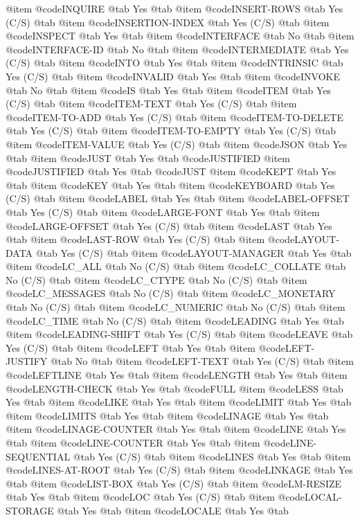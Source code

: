 @item @code{INQUIRE} @tab Yes @tab 
@item @code{INSERT-ROWS} @tab Yes	(C/S) @tab 
@item @code{INSERTION-INDEX} @tab Yes	(C/S) @tab 
@item @code{INSPECT} @tab Yes @tab 
@item @code{INTERFACE} @tab No @tab 
@item @code{INTERFACE-ID} @tab No @tab 
@item @code{INTERMEDIATE} @tab Yes	(C/S) @tab 
@item @code{INTO} @tab Yes @tab 
@item @code{INTRINSIC} @tab Yes	(C/S) @tab 
@item @code{INVALID} @tab Yes @tab 
@item @code{INVOKE} @tab No @tab 
@item @code{IS} @tab Yes @tab 
@item @code{ITEM} @tab Yes	(C/S) @tab 
@item @code{ITEM-TEXT} @tab Yes	(C/S) @tab 
@item @code{ITEM-TO-ADD} @tab Yes	(C/S) @tab 
@item @code{ITEM-TO-DELETE} @tab Yes	(C/S) @tab 
@item @code{ITEM-TO-EMPTY} @tab Yes	(C/S) @tab 
@item @code{ITEM-VALUE} @tab Yes	(C/S) @tab 
@item @code{JSON} @tab Yes @tab 
@item @code{JUST} @tab Yes @tab @code{JUSTIFIED}
@item @code{JUSTIFIED} @tab Yes @tab @code{JUST}
@item @code{KEPT} @tab Yes @tab 
@item @code{KEY} @tab Yes @tab 
@item @code{KEYBOARD} @tab Yes	(C/S) @tab 
@item @code{LABEL} @tab Yes @tab 
@item @code{LABEL-OFFSET} @tab Yes	(C/S) @tab 
@item @code{LARGE-FONT} @tab Yes @tab 
@item @code{LARGE-OFFSET} @tab Yes	(C/S) @tab 
@item @code{LAST} @tab Yes @tab 
@item @code{LAST-ROW} @tab Yes	(C/S) @tab 
@item @code{LAYOUT-DATA} @tab Yes	(C/S) @tab 
@item @code{LAYOUT-MANAGER} @tab Yes @tab 
@item @code{LC_ALL} @tab No	(C/S) @tab 
@item @code{LC_COLLATE} @tab No	(C/S) @tab 
@item @code{LC_CTYPE} @tab No	(C/S) @tab 
@item @code{LC_MESSAGES} @tab No	(C/S) @tab 
@item @code{LC_MONETARY} @tab No	(C/S) @tab 
@item @code{LC_NUMERIC} @tab No	(C/S) @tab 
@item @code{LC_TIME} @tab No	(C/S) @tab 
@item @code{LEADING} @tab Yes @tab 
@item @code{LEADING-SHIFT} @tab Yes	(C/S) @tab 
@item @code{LEAVE} @tab Yes	(C/S) @tab 
@item @code{LEFT} @tab Yes @tab 
@item @code{LEFT-JUSTIFY} @tab No @tab 
@item @code{LEFT-TEXT} @tab Yes	(C/S) @tab 
@item @code{LEFTLINE} @tab Yes @tab 
@item @code{LENGTH} @tab Yes @tab 
@item @code{LENGTH-CHECK} @tab Yes @tab @code{FULL}
@item @code{LESS} @tab Yes @tab 
@item @code{LIKE} @tab Yes @tab 
@item @code{LIMIT} @tab Yes @tab 
@item @code{LIMITS} @tab Yes @tab 
@item @code{LINAGE} @tab Yes @tab 
@item @code{LINAGE-COUNTER} @tab Yes @tab 
@item @code{LINE} @tab Yes @tab 
@item @code{LINE-COUNTER} @tab Yes @tab 
@item @code{LINE-SEQUENTIAL} @tab Yes	(C/S) @tab 
@item @code{LINES} @tab Yes @tab 
@item @code{LINES-AT-ROOT} @tab Yes	(C/S) @tab 
@item @code{LINKAGE} @tab Yes @tab 
@item @code{LIST-BOX} @tab Yes	(C/S) @tab 
@item @code{LM-RESIZE} @tab Yes @tab 
@item @code{LOC} @tab Yes	(C/S) @tab 
@item @code{LOCAL-STORAGE} @tab Yes @tab 
@item @code{LOCALE} @tab Yes @tab 
